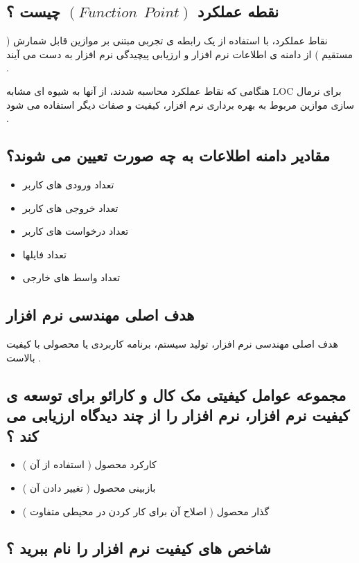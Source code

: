 \documentclass{article}
\begin{document}
\subsection{نقطه عملکرد $( Function\:\:Point )$ چیست ؟ }
نقاط عملکرد، با استفاده از یک رابطه ی تجربی مبتنی بر موازین قابل شمارش ( مستقیم ) از دامنه ی اطلاعات نرم افزار و ارزیابی پیچیدگی نرم افزار به دست می آیند .

هنگامی که نقاط عملکرد محاسبه شدند، از آنها به شیوه ای مشابه LOC برای نرمال سازی موازین مربوط به بهره برداری نرم افزار، کیفیت و صفات دیگر استفاده می شود .

\subsection{مقادیر دامنه اطلاعات به چه صورت تعیین می شوند؟}

\begin{itemize}
	\item تعداد ورودی های کاربر
	\item تعداد خروجی های کاربر
	\item تعداد درخواست های کاربر
	\item تعداد فایلها
	\item تعداد واسط های خارجی
\end{itemize}



\subsection{هدف اصلی مهندسی نرم افزار}
هدف اصلی مهندسی نرم افزار، تولید سیستم، برنامه کاربردی یا محصولی با کیفیت بالاست .




\subsection{مجموعه عوامل کیفیتی مک کال و کارائو برای توسعه ی کیفیت نرم افزار، نرم افزار را از چند دیدگاه ارزیابی می کند ؟}

\begin{itemize}
	\item کارکرد محصول ( استفاده از آن )
	\item بازبینی محصول ( تغییر دادن آن )
	\item گذار محصول ( اصلاح آن برای کار کردن در محیطی متفاوت )
\end{itemize}



\subsection{شاخص های کیفیت نرم افزار را نام ببرید ؟}
\end{document}
